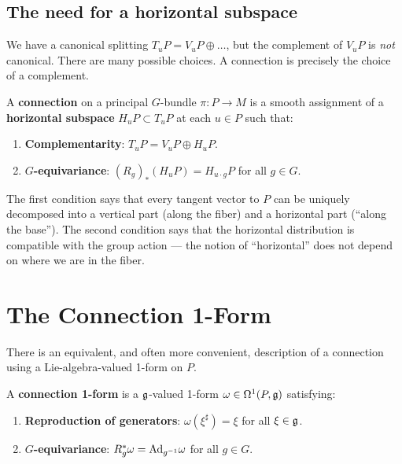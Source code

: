 \subsection{The need for a horizontal subspace}

We have a canonical splitting $T_u P = V_u P \oplus \ldots$, but the complement of $V_u P$ is \emph{not} canonical. There are many possible choices. A connection is precisely the choice of a complement.

\begin{definition}
A \textbf{connection} on a principal $G$-bundle $\pi: P \to M$ is a smooth assignment of a \textbf{horizontal subspace} $H_u P \subset T_u P$ at each $u \in P$ such that:
\begin{enumerate}
\item \textbf{Complementarity}: $T_u P = V_u P \oplus H_u P$.
\item \textbf{$G$-equivariance}: $(R_g)_*(H_u P) = H_{u \cdot g} P$ for all $g \in G$.
\end{enumerate}
\end{definition}

The first condition says that every tangent vector to $P$ can be uniquely decomposed into a vertical part (along the fiber) and a horizontal part (``along the base''). The second condition says that the horizontal distribution is compatible with the group action --- the notion of ``horizontal'' does not depend on where we are in the fiber.

\section{The Connection 1-Form}

There is an equivalent, and often more convenient, description of a connection using a Lie-algebra-valued 1-form on $P$.

\begin{definition}
A \textbf{connection 1-form} is a $\mathfrak{g}$-valued 1-form $\omega \in \Omega^1(P, \mathfrak{g})$ satisfying:
\begin{enumerate}
\item \textbf{Reproduction of generators}: $\omega(\xi^\sharp) = \xi$ for all $\xi \in \mathfrak{g}$.
\item \textbf{$G$-equivariance}: $R_g^*\omega = \mathrm{Ad}_{g^{-1}}\omega$ for all $g \in G$.
\end{enumerate}
\end{definition}

